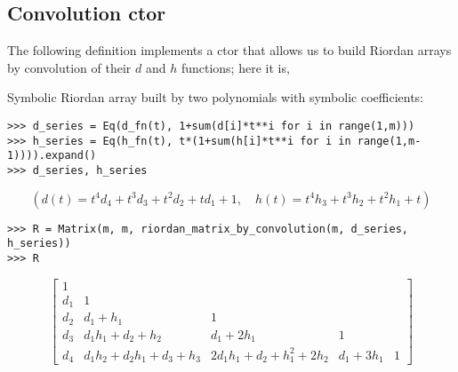 \subsection{Convolution ctor}

The following definition implements a ctor that allows us to build Riordan
arrays by convolution of their $d$ and $h$ functions; here it is,


\begin{example}
Symbolic Riordan array built by two polynomials with symbolic coefficients:
\begin{verbatim}
>>> d_series = Eq(d_fn(t), 1+sum(d[i]*t**i for i in range(1,m)))
>>> h_series = Eq(h_fn(t), t*(1+sum(h[i]*t**i for i in range(1,m-1)))).expand()
>>> d_series, h_series
\end{verbatim}
\begin{displaymath}
\left ( d{\left (t \right )} = t^{4} d_{4} + t^{3} d_{3} + t^{2} d_{2} + t d_{1} + 1, \quad h{\left (t \right )} = t^{4} h_{3} + t^{3} h_{2} + t^{2} h_{1} + t\right )
\end{displaymath}
\begin{verbatim}
>>> R = Matrix(m, m, riordan_matrix_by_convolution(m, d_series, h_series))
>>> R
\end{verbatim}
\begin{displaymath}
\left[\begin{matrix}1 &   &   &   &  \\d_{1} & 1 &   &   &  \\d_{2} & d_{1} + h_{1} & 1 &   &  \\d_{3} & d_{1} h_{1} + d_{2} + h_{2} & d_{1} + 2 h_{1} & 1 &  \\d_{4} & d_{1} h_{2} + d_{2} h_{1} + d_{3} + h_{3} & 2 d_{1} h_{1} + d_{2} + h_{1}^{2} + 2 h_{2} & d_{1} + 3 h_{1} & 1\end{matrix}\right]
\end{displaymath}
\end{example}


